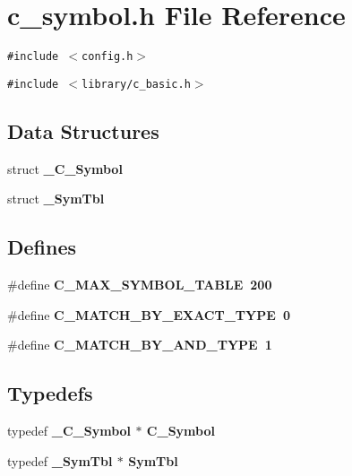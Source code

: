 \section{c\_\-symbol.h File Reference}
\label{c__symbol_8h}
{\tt \#include $<$config.h$>$}\par
{\tt \#include $<$library/c\_\-basic.h$>$}\par
\subsection*{Data Structures}
\begin{CompactItemize}
\item 
struct \bf{\_\-C\_\-Symbol}
\item 
struct \bf{\_\-Sym\-Tbl}
\end{CompactItemize}
\subsection*{Defines}
\begin{CompactItemize}
\item 
\#define \bf{C\_\-MAX\_\-SYMBOL\_\-TABLE}~200
\item 
\#define \bf{C\_\-MATCH\_\-BY\_\-EXACT\_\-TYPE}~0
\item 
\#define \bf{C\_\-MATCH\_\-BY\_\-AND\_\-TYPE}~1
\end{CompactItemize}
\subsection*{Typedefs}
\begin{CompactItemize}
\item 
typedef \bf{\_\-C\_\-Symbol} $\ast$ \bf{C\_\-Symbol}
\item 
typedef \bf{\_\-Sym\-Tbl} $\ast$ \bf{Sym\-Tbl}
\end{CompactItemize}
